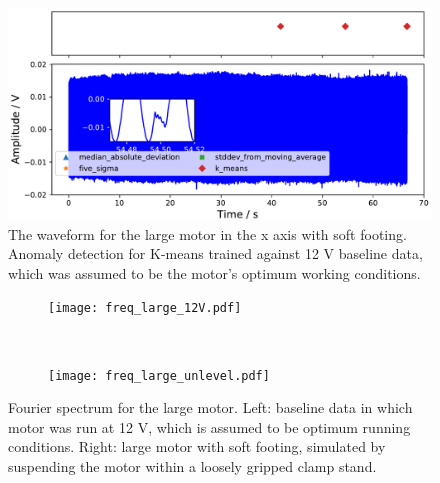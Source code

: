 \begin{figure}[t]
    \includegraphics[width=1.0\textwidth]{fig/large_unlevel_large_12V.pdf}
    \caption[Anomaly Tests Large Motor Uneven Footing]{The waveform for the large motor in the x axis with soft footing. Anomaly detection for K-means trained against 12 V baseline data, which was assumed to be the motor's optimum working conditions.}
    \label{fig:large_uneven_footing}
\end{figure}



\begin{figure}[t!]
    \centering
    \begin{subfigure}[t]{0.5\textwidth}
        \centering
        \texttt{[image: freq\_large\_12V.pdf]}
    \end{subfigure}%
    ~ 
    \begin{subfigure}[t]{0.5\textwidth}
        \centering
        \texttt{[image: freq\_large\_unlevel.pdf]}
    \end{subfigure}
    \caption[Fourier Plot Soft Footing]{Fourier spectrum for the large motor. Left: baseline data in which motor was run at 12 V, which is assumed to be optimum running conditions. Right: large motor with soft footing, simulated by suspending the motor within a loosely gripped clamp stand. }
\end{figure}


